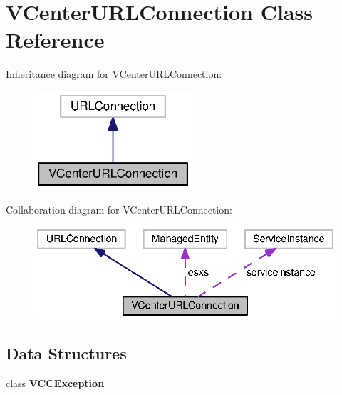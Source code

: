\section{V\+Center\+U\+R\+L\+Connection Class Reference}
\label{classorg_1_1smallfoot_1_1parser_1_1vmware_1_1VCenterURLConnection}


Inheritance diagram for V\+Center\+U\+R\+L\+Connection\+:
\nopagebreak
\begin{figure}[H]
\begin{center}
\leavevmode
\includegraphics[width=166pt]{classorg_1_1smallfoot_1_1parser_1_1vmware_1_1VCenterURLConnection__inherit__graph}
\end{center}
\end{figure}


Collaboration diagram for V\+Center\+U\+R\+L\+Connection\+:
\nopagebreak
\begin{figure}[H]
\begin{center}
\leavevmode
\includegraphics[width=336pt]{classorg_1_1smallfoot_1_1parser_1_1vmware_1_1VCenterURLConnection__coll__graph}
\end{center}
\end{figure}
\subsection*{Data Structures}
\begin{DoxyCompactItemize}
\item 
class {\bf V\+C\+C\+Exception}
\end{DoxyCompactItemize}
